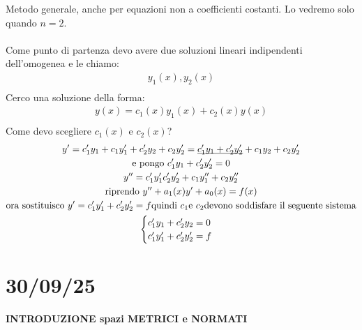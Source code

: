 \documentclass[a4paper, oneside]{article}
\begin{document}
\begin{proposition}
    Metodo generale, anche per equazioni non a coefficienti costanti. Lo vedremo solo quando $n=2$.\\
    \\
    Come punto di partenza devo avere due soluzioni lineari indipendenti dell'omogenea e le chiamo:\\
    \begin{gather*}
        y_1(x), y_2(x)\\
    \end{gather*} 
    Cerco una soluzione della forma:\\
    \begin{gather*}
        y(x) = c_1(x) y_1(x) + c_2(x) y(x)\\
    \end{gather*}
    Come devo scegliere $c_1(x)$ e $c_2(x)$?\\
    \begin{gather*}
        y' = c_1' y_1 + c_1 y_1' + c_2' y_2 + c_2 y_2' = \text{\underbar{$c_1' y_1 + c_2' y_2'$}} + c_1 y_2 + c_2 y_2' \\\text{e pongo $c_1' y_1 + c_2' y_2' = 0$} \\
        y'' = c_1' y_1' c_2' y_2' + c_1 y_1'' + c_2 y_2''\\
        \text{riprendo} \ y'' + a_1(x)y' + a_0(x) = f(x)\\
        \text{ora sostituisco } y' = c_1' y_1' + c_2' y_2' = f \text{quindi } c_1 \text{e} \ c_2 \text{devono soddisfare il seguente sistema}\\
        \begin{cases}
            c_1' y_1 + c_2' y_2 = 0\\
            c_1' y_1' + c_2' y_2' = f\\
        \end{cases}
    \end{gather*}
\end{proposition}

\newpage
\section{30/09/25}
\textbf{INTRODUZIONE spazi METRICI e NORMATI}
\end{document}
